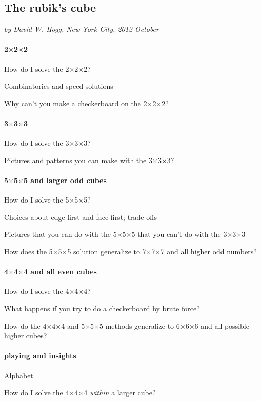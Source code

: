 \documentclass[12pt,pdftex]{article}
\newcommand{\by}[1]{{#1}$\times${#1}$\times${#1}}
\begin{document}
\subsection*{The rubik's cube}

\noindent
\textsl{by David W. Hogg, New York City, 2012 October}
\vspace{1ex}

\paragraph{\by{2}}

How do I solve the \by{2}?

Combinatorics and speed solutions

Why can't you make a checkerboard on the \by{2}?

\paragraph{\by{3}}

How do I solve the \by{3}?

Pictures and patterns you can make with the \by{3}?

\paragraph{\by{5} and larger odd cubes}

How do I solve the \by{5}?

Choices about edge-first and face-first; trade-offs

Pictures that you can do with the \by{5} that you can't do with the \by{3}

How does the \by{5} solution generalize to \by{7} and all higher odd numbers?

\paragraph{\by{4} and all even cubes}

How do I solve the \by{4}?

What happens if you try to do a checkerboard by brute force?

How do the \by{4} and \by{5} methods generalize to \by{6} and all possible higher cubes?

\paragraph{playing and insights}

Alphabet

How do I solve the \by{4} \emph{within} a larger cube?
\end{document}
